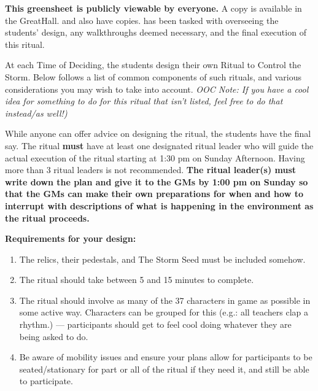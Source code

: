 \documentclass[green]{GL2020}
\begin{document}
\name{\gRitualControlStorm{}}
\textbf{This greensheet is publicly viewable by everyone.} A copy is available in the GreatHall. \cPrincipal{\full} and \cChupSecond{\full} also have copies. \cChupSecond{} has been tasked with overseeing the students' design, any walkthroughs deemed necessary, and the final execution of this ritual. 

At each Time of Deciding, the students design their own Ritual to Control the Storm. Below follows a list of common components of such rituals, and various considerations you may wish to take into account. \emph{OOC Note: If you have a cool idea for something to do for this ritual that isn’t listed, feel free to do that instead/as well!)}

While anyone can offer advice on designing the ritual, the students have the final say. The ritual \textbf{must} have at least one designated ritual leader who will guide the actual execution of the ritual starting at 1:30 pm on Sunday Afternoon. Having more than 3 ritual leaders is not recommended. \textbf{The ritual leader(s) must write down the plan and give it to the GMs by 1:00 pm on Sunday so that the GMs can make their own preparations for when and how to interrupt with descriptions of what is happening in the environment as the ritual proceeds.}

\textbf{Requirements for your design:}
\begin{enumerate}
  \item The relics, their pedestals, and The Storm Seed must be included somehow.
  \item The ritual should take between 5 and 15 minutes to complete.
  \item The ritual should involve as many of the 37 characters in game as possible in some active way. Characters can be grouped for this (e.g.: all teachers clap a rhythm.) — participants should get to feel cool doing whatever they are being asked to do.
  \item Be aware of mobility issues and ensure your plans allow for participants to be seated/stationary for part or all of the ritual if they need it, and still be able to participate.
\end{enumerate}
\end{document}
